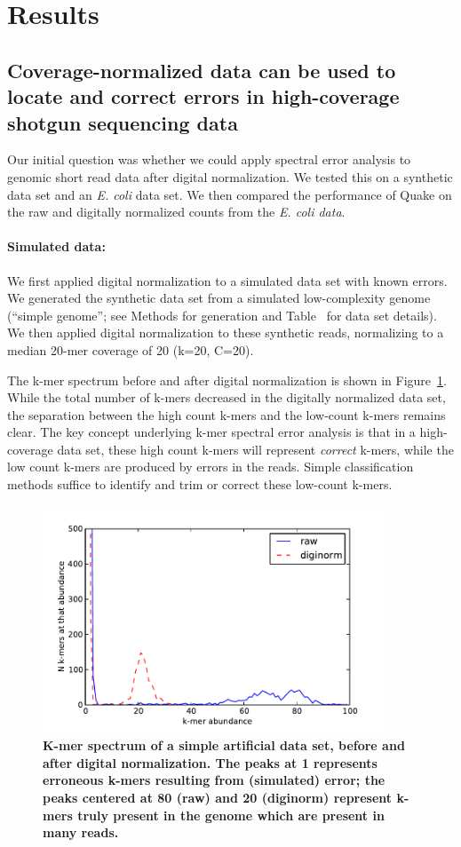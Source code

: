 \documentclass{article}
\begin{document}
\section{Results}

\subsection{Coverage-normalized data can be used to locate
and correct errors in high-coverage shotgun sequencing data}

Our initial question was whether we could apply spectral error analysis
to genomic short read data after digital normalization.  We
tested this on a synthetic data set and an {\em E. coli} data set.  We
then compared the performance of Quake on the raw and digitally
normalized counts from the {\em E. coli data}.

\paragraph{Simulated data:}
We first applied digital normalization to a simulated data set with
known errors.  We generated the synthetic data set from a simulated
low-complexity genome (``simple genome''; see Methods for generation
and Table~\label{tab:data} for data set details). We then applied
digital normalization to these synthetic reads, normalizing to a
median 20-mer coverage of 20 (k=20, C=20).

The k-mer spectrum before and after digital normalization is shown in
Figure~\ref{fig:spectrum}.  While the total number of k-mers decreased
in the digitally normalized data set, the separation between the high
count k-mers and the low-count k-mers remains clear.  The key concept
underlying k-mer spectral error analysis is that in a high-coverage
data set, these high count k-mers will represent {\em correct} k-mers,
while the low count k-mers are produced by errors in the reads.
Simple classification methods suffice to identify and trim or correct
these low-count k-mers.

\begin{figure}[!ht]
 \centerline{\includegraphics[width=4in]{./figures/kmer-spectrum}}
\caption{\bf K-mer spectrum of a simple artificial data set, before and after digital normalization.  The peaks at 1 represents erroneous k-mers resulting
from (simulated) error; the peaks centered at 80 (raw) and 20 (diginorm)
represent k-mers truly present in the genome which are present in many reads.}
\label{fig:spectrum}
\end{figure}
\end{document}
